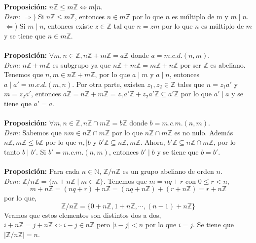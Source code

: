 \documentclass{article}
\begin{document}

\textbf{Proposición:} $n\mathbb{Z}\le m\mathbb{Z}\Leftrightarrow m|n$.\\
\textit{Dem:} $\Rightarrow$) Si $n\mathbb{Z}\le m\mathbb{Z}$, entonces $n\in m\mathbb{Z}$ por lo que $n$ es múltiplo de m y $m\mid n$.\\
$\Leftarrow$) Si $m\mid n$, entonces existe $z\in\mathbb{Z}$ tal que $n=zm$ por lo que $n$ es múltiplo de $m$ y se tiene que $n\in m\mathbb{Z}$.\\\\


\textbf{Proposición:} $\forall m,n\in\mathbb{Z}, n\mathbb{Z}+m\mathbb{Z}=a\mathbb{Z}$ donde $a=m.c.d.(n,m)$.\\
\textit{Dem:} $n\mathbb{Z}+m\mathbb{Z}$ es subgrupo ya que $n\mathbb{Z}+m\mathbb{Z}=m\mathbb{Z}+n\mathbb{Z}$ por ser $\mathbb{Z}$ es abeliano. Tenemos que $n,m\in n\mathbb{Z}+m\mathbb{Z}$, por lo que $a\mid m$ y $a\mid n$, entonces $a\mid a'=m.c.d.(m,n)$. Por otra parte, existen $z_1,z_2\in\mathbb{Z}$ tales que $n=z_1a'$ y $m=z_2a'$, entonces $a\mathbb{Z}=n\mathbb{Z}+m\mathbb{Z}=z_1a'\mathbb{Z}+z_2a'\mathbb{Z}\subseteq a'\mathbb{Z}$ por lo que $a'\mid a$ y se tiene que $a'=a$.\\\\


\textbf{Proposición:} $\forall m,n\in\mathbb{Z}, n\mathbb{Z}\cap m\mathbb{Z}=b\mathbb{Z}$ donde $b=m.c.m.(n,m)$.\\
\textit{Dem:} Sabemos que $nm\in n\mathbb{Z}\cap m\mathbb{Z}$ por lo que $n\mathbb{Z}\cap m\mathbb{Z}$ es no nulo. Además $n\mathbb{Z},m\mathbb{Z}\le b\mathbb{Z}$ por lo que $n,\mid b$ y $b'\mathbb{Z}\subseteq n\mathbb{Z},m\mathbb{Z}$. Ahora, $b'\mathbb{Z}\subseteq n\mathbb{Z}\cap m\mathbb{Z}$, por lo tanto $b\mid b'$. Si $b'=m.c.m.(n,m)$, entonces $b'\mid b$ y se tiene que $b=b'$.\\\\


\textbf{Proposición:} Para cada $n\in\mathbb{N}$, $\mathbb{Z}/n\mathbb{Z}$ es un grupo abeliano de orden $n$.\\
\textit{Dem:} $\mathbb{Z}/n\mathbb{Z}=\{m+n\mathbb{Z}\mid m\in\mathbb{Z}\}$. Tenemos que $m=nq+r$ con $0\le r<n$,
$$
m+n\mathbb{Z}=(nq+r)+n\mathbb{Z}=(nq+n\mathbb{Z})+(r+n\mathbb{Z})=r+n\mathbb{Z}
$$
por lo que,
$$
\mathbb{Z}/n\mathbb{Z}=\{0+n\mathbb{Z},1+n\mathbb{Z},\cdots,(n-1)+n\mathbb{Z}\}
$$
Veamos que estos elementos son distintos dos a dos, $i+n\mathbb{Z}=j+n\mathbb{Z}\Leftrightarrow i-j\in n\mathbb{Z}$ pero $|i-j|<n$ por lo que $i=j$. Se tiene que $|\mathbb{Z}/n\mathbb{Z}|=n$.\\\\
\end{document}
